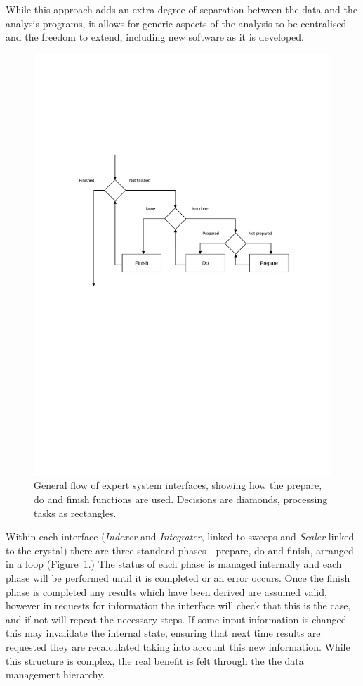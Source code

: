 \documentclass[preprint,pdf]{iucr}
\begin{document}
While this approach adds an extra degree of separation between the
data and the analysis programs, it allows for generic aspects of the
analysis to be centralised and the freedom to extend, including
new software as it is developed. 

\begin{figure}
\caption{General flow of expert system interfaces, showing how the
  prepare, do and finish functions are used. Decisions are diamonds,
  processing tasks as rectangles.
\label{figure:fig6}}
\centering
\includegraphics[scale=0.5]{figures/Fig6.pdf}
\end{figure}

Within each interface (\emph{Indexer} and \emph{Integrater}, linked to
sweeps and 
\emph{Scaler} linked to the crystal) there are three standard phases -
prepare, do and 
finish, arranged in a loop (Figure~\ref{figure:fig6}.) 
The status of each phase is
managed internally and each phase will be performed until it is
completed or an error occurs. Once the finish phase is completed any
results which have been derived are assumed valid, however in requests
for information the interface will check that this is the case, and if
not will repeat the necessary steps. If some input information is
changed this may invalidate the internal state, ensuring that next
time results are requested they are recalculated taking into account
this new information. While this structure is complex, the
real benefit is felt through the the data management hierarchy.
\end{document}
